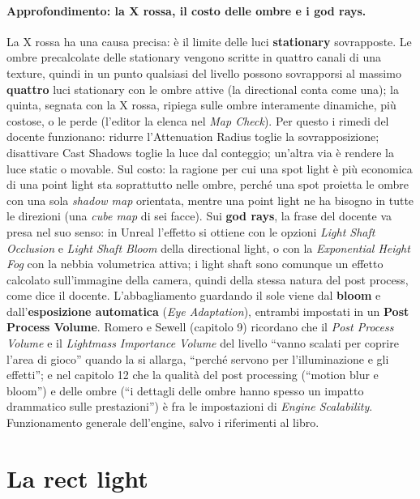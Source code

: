 \paragraph{Approfondimento: la X rossa, il costo delle ombre e i god rays.} La X rossa ha
una causa precisa: è il limite delle luci \textbf{stationary} sovrapposte. Le ombre
precalcolate delle stationary vengono scritte in quattro canali di una texture, quindi in
un punto qualsiasi del livello possono sovrapporsi al massimo \textbf{quattro} luci
stationary con le ombre attive (la directional conta come una); la quinta, segnata con la X
rossa, ripiega sulle ombre interamente dinamiche, più costose, o le perde (l'editor la
elenca nel \emph{Map Check}). Per questo i rimedi del docente funzionano: ridurre
l'Attenuation Radius toglie la sovrapposizione; disattivare Cast Shadows toglie la luce dal
conteggio; un'altra via è rendere la luce static o movable. Sul costo: la ragione per cui
una spot light è più economica di una point light sta soprattutto nelle ombre, perché una
spot proietta le ombre con una sola \emph{shadow map} orientata, mentre una point light ne
ha bisogno in tutte le direzioni (una \emph{cube map} di sei facce). Sui \textbf{god rays},
la frase del docente va presa nel suo senso: in Unreal l'effetto si ottiene con le opzioni
\emph{Light Shaft Occlusion} e \emph{Light Shaft Bloom} della directional light, o con la
\emph{Exponential Height Fog} con la nebbia volumetrica attiva; i light shaft sono
comunque un effetto calcolato sull'immagine della camera, quindi della stessa natura del
post process, come dice il docente. L'abbagliamento guardando il sole viene dal
\textbf{bloom} e dall'\textbf{esposizione automatica} (\emph{Eye Adaptation}), entrambi
impostati in un \textbf{Post Process Volume}. Romero e Sewell (capitolo 9) ricordano che il
\emph{Post Process Volume} e il \emph{Lightmass Importance Volume} del livello ``vanno
scalati per coprire l'area di gioco'' quando la si allarga, ``perché servono per
l'illuminazione e gli effetti''; e nel capitolo 12 che la qualità del post processing
(``motion blur e bloom'') e delle ombre (``i dettagli delle ombre hanno spesso un impatto
drammatico sulle prestazioni'') è fra le impostazioni di \emph{Engine Scalability}.
Funzionamento generale dell'engine, salvo i riferimenti al libro.

\section{La rect light}
\label{ue13:sec:rect}

